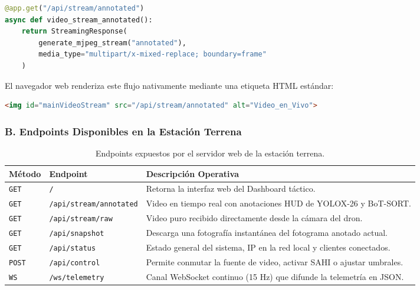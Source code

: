\documentclass[11pt,a4paper]{article}
\begin{document}
\begin{lstlisting}[language=Python]
@app.get("/api/stream/annotated")
async def video_stream_annotated():
    return StreamingResponse(
        generate_mjpeg_stream("annotated"),
        media_type="multipart/x-mixed-replace; boundary=frame"
    )
\end{lstlisting}

El navegador web renderiza este flujo nativamente mediante una etiqueta HTML estándar:
\begin{lstlisting}[language=html]
<img id="mainVideoStream" src="/api/stream/annotated" alt="Video_en_Vivo">
\end{lstlisting}

\subsubsection*{B. Endpoints Disponibles en la Estación Terrena}
\begin{table}[H]
\centering
\small
\begin{tabularx}{\textwidth}{ll>{\raggedright\arraybackslash}X}
\toprule
\textbf{Método} & \textbf{Endpoint} & \textbf{Descripción Operativa} \\
\midrule
\texttt{GET} & \texttt{/} & Retorna la interfaz web del Dashboard táctico. \\
\texttt{GET} & \texttt{/api/stream/annotated} & Video en tiempo real con anotaciones HUD de YOLOX-26 y BoT-SORT. \\
\texttt{GET} & \texttt{/api/stream/raw} & Video puro recibido directamente desde la cámara del dron. \\
\texttt{GET} & \texttt{/api/snapshot} & Descarga una fotografía instantánea del fotograma anotado actual. \\
\texttt{GET} & \texttt{/api/status} & Estado general del sistema, IP en la red local y clientes conectados. \\
\texttt{POST} & \texttt{/api/control} & Permite conmutar la fuente de video, activar SAHI o ajustar umbrales. \\
\texttt{WS} & \texttt{/ws/telemetry} & Canal WebSocket continuo (15 Hz) que difunde la telemetría en JSON. \\
\bottomrule
\end{tabularx}
\caption{Endpoints expuestos por el servidor web de la estación terrena.}
\label{tab:api_endpoints}
\end{table}
\end{document}
